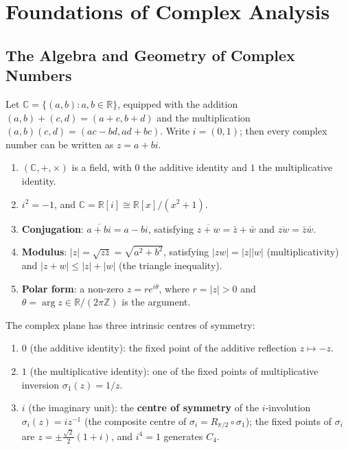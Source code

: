 \section{Foundations of Complex Analysis}\label{sec:complex_analysis}

\subsection{The Algebra and Geometry of Complex Numbers}

\begin{definition}\label{def:complex_field}
Let $\mathbb{C} = \{(a, b) : a, b \in \mathbb{R}\}$, equipped with the addition $(a,b)+(c,d) = (a+c, b+d)$ and the multiplication $(a,b)(c,d) = (ac - bd, ad + bc)$. Write $i = (0,1)$; then every complex number can be written as $z = a + bi$.
\end{definition}

\begin{property}\label{prop:complex_field_props}
\begin{enumerate}[label=(\roman*)]
    \item $(\mathbb{C}, +, \times)$ is a field, with $0$ the additive identity and $1$ the multiplicative identity.
    \item $i^2 = -1$, and $\mathbb{C} = \mathbb{R}[i] \cong \mathbb{R}[x]/(x^2+1)$.
    \item \textbf{Conjugation}: $\overline{a+bi} = a - bi$, satisfying $\overline{z+w} = \bar z + \bar w$ and $\overline{zw} = \bar z \bar w$.
    \item \textbf{Modulus}: $|z| = \sqrt{z\bar z} = \sqrt{a^2+b^2}$, satisfying $|zw| = |z||w|$ (multiplicativity) and $|z+w| \le |z|+|w|$ (the triangle inequality).
    \item \textbf{Polar form}: a non-zero $z = re^{i\theta}$, where $r = |z| > 0$ and $\theta = \arg z \in \mathbb{R}/(2\pi\mathbb{Z})$ is the argument.
\end{enumerate}
\end{property}

\begin{definition}\label{def:complex_centres}
The complex plane has three intrinsic centres of symmetry:
\begin{enumerate}[label=(\roman*)]
    \item $0$ (the additive identity): the fixed point of the additive reflection $z \mapsto -z$.
    \item $1$ (the multiplicative identity): one of the fixed points of multiplicative inversion $\sigma_1(z) = 1/z$.
    \item $i$ (the imaginary unit): the \textbf{centre of symmetry} of the $i$-involution $\sigma_i(z) = i z^{-1}$ (the composite centre of $\sigma_i = R_{\pi/2}\circ\sigma_1$); the fixed points of $\sigma_i$ are $z = \pm\frac{\sqrt2}{2}(1+i)$, and $i^4 = 1$ generates $C_4$.
\end{enumerate}
\end{definition}

